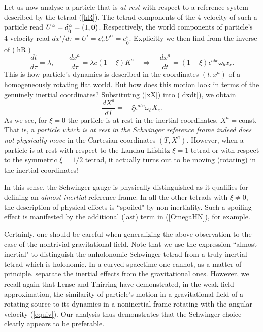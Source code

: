 \documentclass[preprint,showpacs,preprintnumbers,amsmath,amssymb]{revtex4}
\begin{document}
Let us now analyse a particle that is {\it at rest} with respect to a reference system
described by the tetrad (\ref{hR}). The tetrad components of the 4-velocity of such
a particle read $U^\alpha = \delta^\alpha_{\hat 0} = (1, {\bf 0})$. Respectively,
the world components of particle's 4-velocity read $dx^i/d\tau = U^i = e^i_\alpha
U^\alpha = e^i_{\hat 0}$. Explicitly we then find from the inverse of (\ref{hR})
\begin{equation}\label{dxdt}
{\frac {dt}{d\tau}} = \lambda,\qquad {\frac {dx^a}{d\tau}} = \lambda c (1 - \xi)K^a
\quad \Longrightarrow \quad {\frac {dx^a}{dt}} = (1 - \xi)\epsilon^{abc}\omega_bx_c.
\end{equation}
This is how particle's dynamics is described in the coordinates $(t, x^a)$ of a
homogeneously rotating flat world. But how does this motion look in terms of the
genuinely inertial coordinates? Substituting (\ref{xX}) into (\ref{dxdt}), we obtain
\begin{equation}\label{dxdt1}
{\frac {dX^a}{dT}} = -\,\xi\epsilon^{abc}\omega_bX_c.
\end{equation}
As we see, for $\xi = 0$ the particle is at rest in the inertial coordinates,
$X^a =$const. That is, a {\it particle which is at rest in the Schwinger reference
frame indeed does not physically move} in the Cartesian coordinates $(T, X^a)$.
However, when a particle is at rest with respect to the Landau-Lifshitz $\xi = 1$
tetrad or with respect to the symmetric $\xi = 1/2$ tetrad, it actually turns out
to be moving (rotating) in the inertial coordinates!

In this sense, the Schwinger gauge is physically distinguished as it qualifies for
defining an {\it almost inertial} reference frame. In all the other tetrads with
$\xi \neq 0$, the description of physical effects is ``spoiled" by non-inertiality.
Such a spoiling effect is manifested by the additional (last) term in (\ref{OmegaHN}),
for example.

Certainly, one should be careful when generalizing the above observation
to the case of the nontrivial gravitational field. Note that we use the
expression ``almost inertial" to distinguish the anholonomic Schwinger
tetrad from a truly inertial tetrad which is holonomic. In a curved spacetime
one cannot, as a matter of principle, separate the inertial effects from the
gravitational ones. However, we recall again that Lense and Thirring have
demonstrated, in the weak-field approximation, the similarity of particle's
motion in a gravitational field of a rotating source to its dynamics in a
noninertial frame rotating with the angular velocity (\ref{equiv}). Our analysis
thus demonstrates that the Schwinger choice clearly appears to be preferable.
\end{document}
